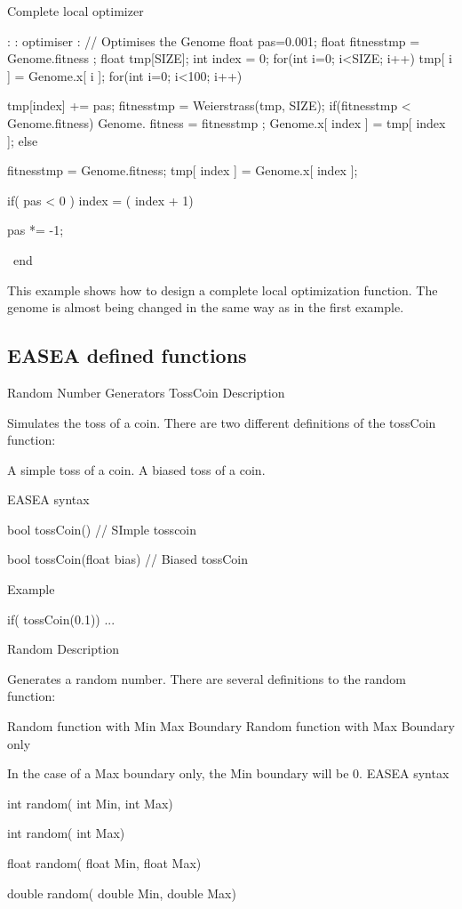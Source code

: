 \documentclass{article}
\begin{document}
Complete local optimizer

\GenomeClass : : optimiser	:	//	Optimises	the	Genome 
 float pas=0.001;
 float fitnesstmp = Genome.fitness ; 
 float tmp[SIZE]; 
 int index = 0;
 for(int i=0; i<SIZE; i++) 
  tmp[ i ] = Genome.x[ i ];
 for(int i=0; i<100; i++){ 
  tmp[index] += pas;
  fitnesstmp = Weierstrass(tmp, SIZE);
  if(fitnesstmp < Genome.fitness){ 
   Genome. fitness = fitnesstmp ;
   Genome.x[ index ] = tmp[ index ];
  }
  else {
   fitnesstmp = Genome.fitness;
   tmp[ index ] = Genome.x[ index ];
  
   if( pas < 0 )
    index = ( index + 1)%
    
   pas *= -1;
  }
 }
\ end

This example shows how to design a complete local optimization function. The genome is almost being changed in the same way as in the first example.

\subsection{EASEA defined functions} %
\label{sub:EASEA defined functions}
Random Number Generators
TossCoin
Description

Simulates the toss of a coin. There are two different definitions of the tossCoin function:

    A simple toss of a coin.
    A biased toss of a coin.

EASEA syntax

bool tossCoin()                // SImple tosscoin

bool tossCoin(float bias)  // Biased tossCoin

Example

if( tossCoin(0.1)){
    ...
}

Random
Description

Generates a random number. There are several definitions to the random function:

    Random function with Min Max Boundary
    Random function with Max Boundary only

In the case of a Max boundary only, the Min boundary will be 0.
EASEA syntax

int random( int Min, int Max)

int random( int Max)

float random( float Min, float Max)

double random( double Min, double Max)
\end{document}
